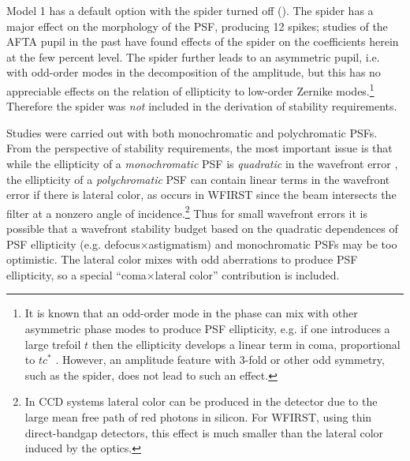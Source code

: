 Model 1 has a default option with the spider turned off (). The spider has a major effect on the morphology of the PSF, producing 12 spikes; studies of the AFTA pupil in the past have found effects of the spider on the coefficients herein at the few percent level. The spider further leads to an asymmetric pupil, i.e. with odd-order modes in the decomposition of the amplitude, but this has no appreciable effects on the relation of ellipticity to low-order Zernike modes.\footnote{It is known that an odd-order mode in the phase can mix with other asymmetric phase modes to produce PSF ellipticity, e.g. if one introduces a large trefoil $t$ then the ellipticity develops a linear term in coma, proportional to $tc^\ast$ \citep{2010SPIE.7731E..37N}. However, an amplitude feature with 3-fold or other odd symmetry, such as the spider, does not lead to such an effect.} Therefore the spider was {\em not} included in the derivation of stability requirements.

Studies were carried out with both monochromatic and polychromatic PSFs. From the perspective of stability requirements, the most important issue is that while the ellipticity of a {\em monochromatic} PSF is {\em quadratic} in the wavefront error \citep[e.g.][]{2010SPIE.7731E..37N}, the ellipticity of a {\em polychromatic} PSF can contain linear terms in the wavefront error if there is lateral color, as occurs in WFIRST since the beam intersects the filter at a nonzero angle of incidence.\footnote{In CCD systems lateral color can be produced in the detector due to the large mean free path of red photons in silicon. For WFIRST, using thin direct-bandgap detectors, this effect is much smaller than the lateral color induced by the optics.} Thus for small wavefront errors it is possible that a wavefront stability budget based on the quadratic dependences of PSF ellipticity (e.g. defocus$\times$astigmatism) and monochromatic PSFs may be too optimistic. The lateral color mixes with odd aberrations to produce PSF ellipticity, so a special ``coma$\times$lateral color'' contribution is included.


